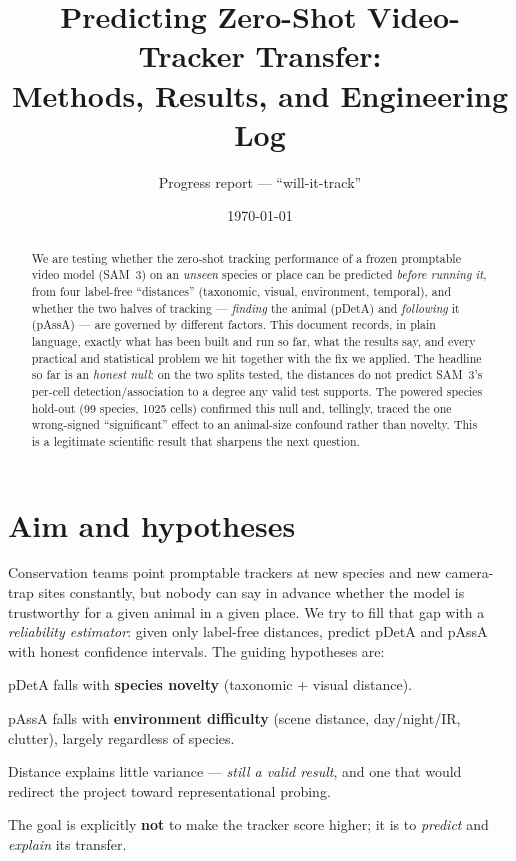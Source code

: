 \documentclass[11pt]{article}
\title{\textbf{Predicting Zero-Shot Video-Tracker Transfer:\\ Methods, Results, and Engineering Log}}
\author{Progress report --- ``will-it-track''}
\date{\today}
\newcommand{\pdeta}{\textsf{pDetA}}
\newcommand{\passa}{\textsf{pAssA}}
\begin{document}
\maketitle

\begin{abstract}
\noindent We are testing whether the zero-shot tracking performance of a frozen promptable
video model (SAM~3) on an \emph{unseen} species or place can be predicted \emph{before running it},
from four label-free ``distances'' (taxonomic, visual, environment, temporal), and whether the two
halves of tracking --- \emph{finding} the animal (\pdeta{}) and \emph{following} it (\passa{}) --- are
governed by different factors. This document records, in plain language, exactly what has been built and
run so far, what the results say, and every practical and statistical problem we hit together with the
fix we applied. The headline so far is an \emph{honest null}: on the two splits tested, the distances do
not predict SAM~3's per-cell detection/association to a degree any valid test supports. The powered species
hold-out (99 species, 1025 cells) confirmed this null and, tellingly, traced the one wrong-signed
``significant'' effect to an animal-size confound rather than novelty. This is a legitimate scientific
result that sharpens the next question.
\end{abstract}

\section{Aim and hypotheses}
Conservation teams point promptable trackers at new species and new camera-trap sites constantly, but
nobody can say in advance whether the model is trustworthy for a given animal in a given place. We try to
fill that gap with a \emph{reliability estimator}: given only label-free distances, predict \pdeta{} and
\passa{} with honest confidence intervals. The guiding hypotheses are:
\begin{description}[leftmargin=2.2em,itemsep=2pt]
  \item[H1 (detection).] \pdeta{} falls with \textbf{species novelty} (taxonomic + visual distance).
  \item[H2 (association).] \passa{} falls with \textbf{environment difficulty} (scene distance, day/night/IR,
        clutter), largely regardless of species.
  \item[H0 (null).] Distance explains little variance --- \emph{still a valid result}, and one that would
        redirect the project toward representational probing.
\end{description}
The goal is explicitly \textbf{not} to make the tracker score higher; it is to \emph{predict} and
\emph{explain} its transfer.
\end{document}
